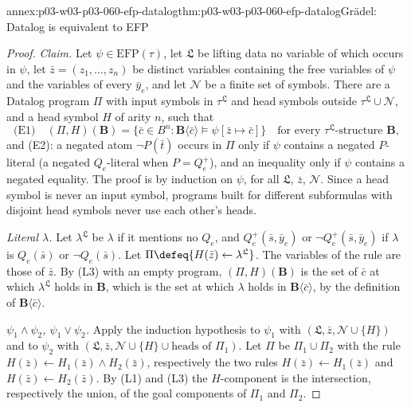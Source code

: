 \begin{annexitem}{annex:p03-w03-p03-060-efp-datalog}{thm:p03-w03-p03-060-efp-datalog}{Gr\"adel: Datalog is equivalent to EFP}
\begin{proof}
\emph{Claim.} Let \(\psi\in\mathrm{EFP}(\tau)\), let \(\mathfrak L\) be
lifting data no variable of which occurs in \(\psi\), let
\(\bar z=(z_1,\ldots,z_n)\) be distinct variables containing the free
variables of \(\psi\) and the variables of every \(\bar y_e\), and let
\(\mathcal N\) be a finite set of symbols. There are a Datalog program
\(\Pi\) with input symbols in \(\tau^{\mathfrak L}\) and head symbols
outside \(\tau^{\mathfrak L}\cup\mathcal N\), and a head symbol \(H\) of
arity \(n\), such that
\[
 \text{(E1)}\quad(\Pi,H)(\mathbf B)=\{\bar c\in B^n:\mathbf B\langle\bar c\rangle\models\psi[\bar z\mapsto\bar c]\}
 \quad\text{for every }\tau^{\mathfrak L}\text{-structure }\mathbf B,
\]
and (E2): a negated atom \(\neg P(\bar t)\) occurs in \(\Pi\) only if
\(\psi\) contains a negated \(P\)-literal (a negated \(Q_e\)-literal when
\(P=Q_e^+\)), and an inequality only if \(\psi\) contains a negated
equality. The proof is by induction on \(\psi\), for all
\(\mathfrak L\), \(\bar z\), \(\mathcal N\). Since a head symbol is never
an input symbol, programs built for different subformulas with disjoint
head symbols never use each other's heads.

\emph{Literal \(\lambda\).} Let \(\lambda^{\mathfrak L}\) be \(\lambda\) if
it mentions no \(Q_e\), and \(Q_e^+(\bar s,\bar y_e)\) or
\(\neg Q_e^+(\bar s,\bar y_e)\) if \(\lambda\) is \(Q_e(\bar s)\) or
\(\neg Q_e(\bar s)\). Let \(\Pi\defeq\{H(\bar z)\leftarrow\lambda^{\mathfrak L}\}\).
The variables of the rule are those of \(\bar z\). By (L3) with an empty
program, \((\Pi,H)(\mathbf B)\) is the set of \(\bar c\) at which
\(\lambda^{\mathfrak L}\) holds in \(\mathbf B\), which is the set at which
\(\lambda\) holds in \(\mathbf B\langle\bar c\rangle\), by the definition of
\(\mathbf B\langle\bar c\rangle\).

\emph{\(\psi_1\wedge\psi_2\), \(\psi_1\vee\psi_2\).} Apply the induction
hypothesis to \(\psi_1\) with \((\mathfrak L,\bar z,\mathcal N\cup\{H\})\)
and to \(\psi_2\) with
\((\mathfrak L,\bar z,\mathcal N\cup\{H\}\cup\text{heads of }\Pi_1)\). Let
\(\Pi\) be \(\Pi_1\cup\Pi_2\) with the rule
\(H(\bar z)\leftarrow H_1(\bar z)\wedge H_2(\bar z)\), respectively the two
rules \(H(\bar z)\leftarrow H_1(\bar z)\) and
\(H(\bar z)\leftarrow H_2(\bar z)\). By (L1) and (L3) the
\(H\)-component is the intersection, respectively the union, of the goal
components of \(\Pi_1\) and \(\Pi_2\).


\end{proof}
\end{annexitem}
